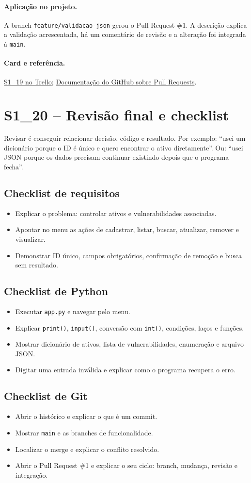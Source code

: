 \documentclass[11pt,a4paper]{article}
\newcommand{\projeto}{\paragraph{Aplicação no projeto.}}
\newcommand{\referencia}[2]{\paragraph{Card e referência.}\href{#1}{#2}}
\newcommand{\cardsection}[1]{\Needspace{12\baselineskip}\subsection{#1}}
\begin{document}
\projeto
A branch \texttt{feature/validacao-json} gerou o Pull Request \#1. A descrição explica a validação acrescentada, há um comentário de revisão e a alteração foi integrada à \texttt{main}.

\referencia{https://trello.com/c/tsLFX3pi}{S1\_19 no Trello}; \href{https://docs.github.com/pull-requests}{Documentação do GitHub sobre Pull Requests}.

\section{S1\_20 -- Revisão final e checklist}

Revisar é conseguir relacionar decisão, código e resultado. Por exemplo: ``usei um dicionário porque o ID é único e quero encontrar o ativo diretamente''. Ou: ``usei JSON porque os dados precisam continuar existindo depois que o programa fecha''.

\cardsection{Checklist de requisitos}
\begin{itemize}
  \item Explicar o problema: controlar ativos e vulnerabilidades associadas.
  \item Apontar no menu as ações de cadastrar, listar, buscar, atualizar, remover e visualizar.
  \item Demonstrar ID único, campos obrigatórios, confirmação de remoção e busca sem resultado.
\end{itemize}

\cardsection{Checklist de Python}
\begin{itemize}
  \item Executar \texttt{app.py} e navegar pelo menu.
  \item Explicar \texttt{print()}, \texttt{input()}, conversão com \texttt{int()}, condições, laços e funções.
  \item Mostrar dicionário de ativos, lista de vulnerabilidades, enumeração e arquivo JSON.
  \item Digitar uma entrada inválida e explicar como o programa recupera o erro.
\end{itemize}

\cardsection{Checklist de Git}
\begin{itemize}
  \item Abrir o histórico e explicar o que é um commit.
  \item Mostrar \texttt{main} e as branches de funcionalidade.
  \item Localizar o merge e explicar o conflito resolvido.
  \item Abrir o Pull Request \#1 e explicar o seu ciclo: branch, mudança, revisão e integração.
\end{itemize}
\end{document}
